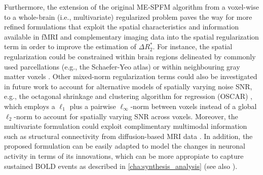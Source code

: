 Furthermore, the extension of the original ME-SPFM algorithm from a voxel-wise
to a whole-brain (i.e., multivariate) regularized problem paves the way for more
refined formulations that exploit the spatial characteristics and information
available in fMRI and complementary imaging data into the spatial regularization
term in order to improve the estimation of $\Delta R_2^*$. For instance, the
spatial regularization could be constrained within brain regions delineated by
commonly used parcellations (e.g., the Schaefer-Yeo atlas)
\citep{Karahanoglu2013TotalactivationfMRI} or within neighbouring gray matter
voxels \citep{Farouj2017Regularizedspatiotemporaldeconvolution}. Other
mixed-norm regularization terms could also be investigated in future work to
account for alternative models of spatially varying noise SNR, e.g., the
octagonal shrinkage and clustering algorithm for regression (OSCAR)
\citep{Gueddari2021CalibrationLessMulti}, which employs a $\ell_1$ plus a
pairwise $\ell_{\infty}$-norm between voxels instead of a global $\ell_2$-norm
to account for spatially varying SNR across voxels. Moreover, the multivariate
formulation could exploit complimentary multimodal information such as
structural connectivity from diffusion-based MRI data
\citep{Bolton2019StructurallyInformedDeconvolution}. In addition, the proposed
formulation can be easily adapted to model the changes in neuronal activity in
terms of its innovations, which can be more appropiate to capture sustained BOLD
events as described in \cref{cha:synthesis_analysis} (see also
\citep{Urunuela2023HemodynamicDeconvolutionDemystified}).

